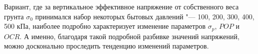 Вариант, где за вертикальное эффективное напряжение от собственного веса грунта $\sigma_0$ принимался набор некоторых бытовых давлений "--- 100, 200, 300, 400, 500 кПа, наиболее подробно характеризует изменение параметров $\sigma_p$, $POP$ и $OCR$. А именно, благодаря такой подробной разбивке значений напряжений, можно досконально проследить тенденцию изменений параметров.